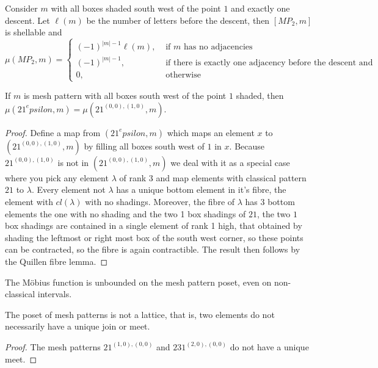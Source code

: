 \documentclass[11pt,a4paper,oneside]{article}
\begin{document}
\begin{cor}
Consider $m$ with all boxes shaded south west of the point $1$ and exactly one descent. Let $\ell(m)$ be the number of letters before the descent, then $[MP_2,m]$ is shellable and 
$$\mu(MP_2,m)=\begin{cases}(-1)^{|m|-1}\ell(m),&\mbox{ if }m\mbox{ has no adjacencies}\\
(-1)^{|m|-1},&\mbox{ if there is exactly one adjacency before the descent and none after}\\
0,&\mbox{ otherwise}\end{cases}$$
\end{cor}


\begin{lem}
If $m$ is mesh pattern with all boxes south west of the point $1$ shaded, then $\mu(21^epsilon,m)=\mu(21^{(0,0),(1,0)},m)$.
\begin{proof}
Define a map from $(21^epsilon,m)$ which maps an element $x$ to $(21^{(0,0),(1,0)},m)$ by filling all boxes south west of $1$ in $x$. Because $21^{(0,0),(1,0)}$ is not in $(21^{(0,0),(1,0)},m)$ we deal with it as a special case where you pick any element $\lambda$ of rank $3$ and map elements with classical pattern $21$ to $\lambda$. Every element not $\lambda$ has a unique bottom element in it's fibre, the element with $cl(\lambda)$ with no shadings. Moreover, the fibre of $\lambda$ has 3 bottom elements the one with no shading and the two 1 box shadings of $21$, the two $1$ box shadings are contained in a single element of rank 1 high, that obtained by shading the leftmost or right most box of the south west corner, so these points can be contracted, so the fibre is again contractible. The result then follows by the Quillen fibre lemma.
\end{proof}
\end{lem}

\begin{cor}
The M\"obius function is unbounded on the mesh pattern poset, even on non-classical intervals.
\end{cor}
\begin{lem}
The poset of mesh patterns is not a lattice, that is, two elements do not necessarily have a unique join or meet.
\begin{proof}
The mesh patterns $21^{(1, 0), (0, 0)}$ and $231^{(2, 0), (0, 0)}$ do not have a unique meet.
\end{proof}
\end{lem}
\end{document}
